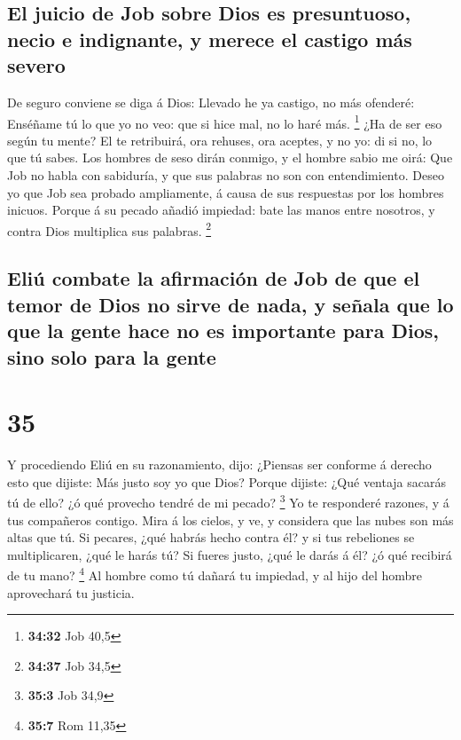 \hypertarget{el-juicio-de-job-sobre-dios-es-presuntuoso-necio-e-indignante-y-merece-el-castigo-muxe1s-severo}{%
\subsection{El juicio de Job sobre Dios es presuntuoso, necio e
indignante, y merece el castigo más
severo}\label{el-juicio-de-job-sobre-dios-es-presuntuoso-necio-e-indignante-y-merece-el-castigo-muxe1s-severo}}

 De seguro conviene se diga á Dios: Llevado he ya castigo,
no más ofenderé:  Enséñame tú lo que yo no veo: que si hice
mal, no lo haré más. \footnote{\textbf{34:32} Job 40,5} 
¿Ha de ser eso según tu mente? El te retribuirá, ora rehuses, ora
aceptes, y no yo: di si no, lo que tú sabes.  Los hombres
de seso dirán conmigo, y el hombre sabio me oirá:  Que Job
no habla con sabiduría, y que sus palabras no son con entendimiento.
 Deseo yo que Job sea probado ampliamente, á causa de sus
respuestas por los hombres inicuos.  Porque á su pecado
añadió impiedad: bate las manos entre nosotros, y contra Dios multiplica
sus palabras. \footnote{\textbf{34:37} Job 34,5}

\hypertarget{eliuxfa-combate-la-afirmaciuxf3n-de-job-de-que-el-temor-de-dios-no-sirve-de-nada-y-seuxf1ala-que-lo-que-la-gente-hace-no-es-importante-para-dios-sino-solo-para-la-gente}{%
\subsection{Eliú combate la afirmación de Job de que el temor de Dios no
sirve de nada, y señala que lo que la gente hace no es importante para
Dios, sino solo para la
gente}\label{eliuxfa-combate-la-afirmaciuxf3n-de-job-de-que-el-temor-de-dios-no-sirve-de-nada-y-seuxf1ala-que-lo-que-la-gente-hace-no-es-importante-para-dios-sino-solo-para-la-gente}}

\hypertarget{section-34}{%
\section{35}\label{section-34}}

 Y procediendo Eliú en su razonamiento, dijo: 
¿Piensas ser conforme á derecho esto que dijiste: Más justo soy yo que
Dios?  Porque dijiste: ¿Qué ventaja sacarás tú de ello? ¿ó
qué provecho tendré de mi pecado? \footnote{\textbf{35:3} Job 34,9}
 Yo te responderé razones, y á tus compañeros contigo.
 Mira á los cielos, y ve, y considera que las nubes son más
altas que tú.  Si pecares, ¿qué habrás hecho contra él? y si
tus rebeliones se multiplicaren, ¿qué le harás tú?  Si
fueres justo, ¿qué le darás á él? ¿ó qué recibirá de tu mano?
\footnote{\textbf{35:7} Rom 11,35}  Al hombre como tú dañará
tu impiedad, y al hijo del hombre aprovechará tu justicia.

